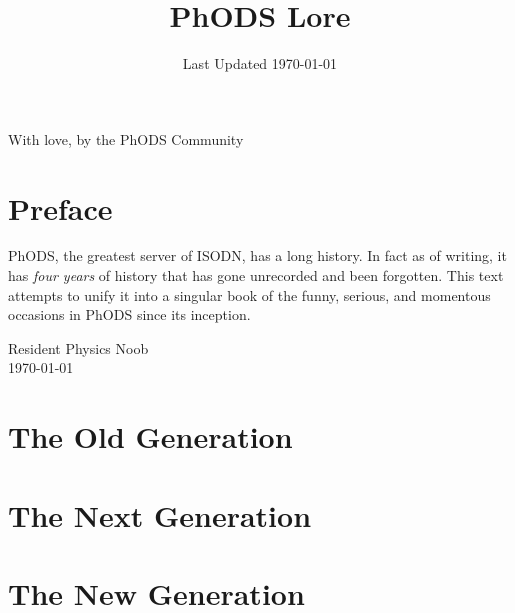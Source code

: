 \documentclass[a4paper]{article}
\title{PhODS Lore}
\date{Last Updated \today}
\begin{document}
\begin{titlepage}
    \centering
    \vspace*{1cm}
    \Huge
    \thetitle{}

    \large
    With love, by the PhODS Community
 \end{titlepage}
\newpage

\section*{Preface}
PhODS, the greatest server of ISODN, has a long history. In fact as of writing, it has \textit{four years} of history that has gone unrecorded and been forgotten. This text attempts to unify it into a singular book of the funny, serious, and momentous occasions in PhODS since its inception.
\begin{flushright}
    Resident Physics Noob\\
    \today
\end{flushright}
\newpage

\tableofcontents
\newpage


\section{The Old Generation}


\section{The Next Generation}


\section{The New Generation}

\end{document}
